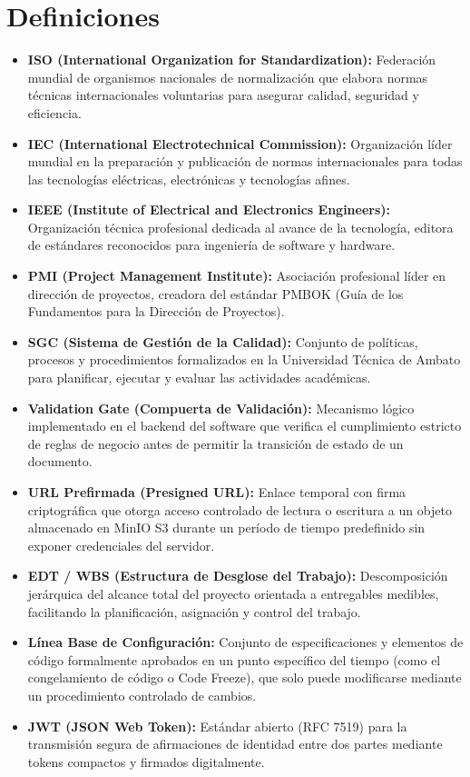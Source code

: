 \documentclass[12pt,a4paper]{article}
\begin{document}
\section{Definiciones}
\begin{itemize}[leftmargin=1.5em, itemsep=2pt]
    \item \textbf{ISO (International Organization for Standardization):} Federación mundial de organismos nacionales de normalización que elabora normas técnicas internacionales voluntarias para asegurar calidad, seguridad y eficiencia.
    \item \textbf{IEC (International Electrotechnical Commission):} Organización líder mundial en la preparación y publicación de normas internacionales para todas las tecnologías eléctricas, electrónicas y tecnologías afines.
    \item \textbf{IEEE (Institute of Electrical and Electronics Engineers):} Organización técnica profesional dedicada al avance de la tecnología, editora de estándares reconocidos para ingeniería de software y hardware.
    \item \textbf{PMI (Project Management Institute):} Asociación profesional líder en dirección de proyectos, creadora del estándar PMBOK (Guía de los Fundamentos para la Dirección de Proyectos).
    \item \textbf{SGC (Sistema de Gestión de la Calidad):} Conjunto de políticas, procesos y procedimientos formalizados en la Universidad Técnica de Ambato para planificar, ejecutar y evaluar las actividades académicas.
    \item \textbf{Validation Gate (Compuerta de Validación):} Mecanismo lógico implementado en el backend del software que verifica el cumplimiento estricto de reglas de negocio antes de permitir la transición de estado de un documento.
    \item \textbf{URL Prefirmada (Presigned URL):} Enlace temporal con firma criptográfica que otorga acceso controlado de lectura o escritura a un objeto almacenado en MinIO S3 durante un período de tiempo predefinido sin exponer credenciales del servidor.
    \item \textbf{EDT / WBS (Estructura de Desglose del Trabajo):} Descomposición jerárquica del alcance total del proyecto orientada a entregables medibles, facilitando la planificación, asignación y control del trabajo.
    \item \textbf{Línea Base de Configuración:} Conjunto de especificaciones y elementos de código formalmente aprobados en un punto específico del tiempo (como el congelamiento de código o Code Freeze), que solo puede modificarse mediante un procedimiento controlado de cambios.
    \item \textbf{JWT (JSON Web Token):} Estándar abierto (RFC 7519) para la transmisión segura de afirmaciones de identidad entre dos partes mediante tokens compactos y firmados digitalmente.
\end{itemize}
\end{document}
